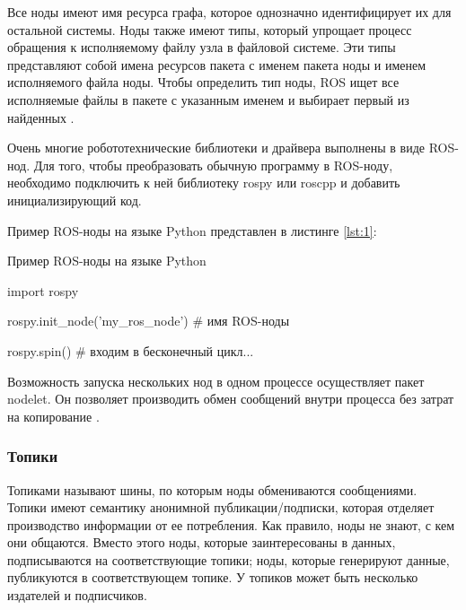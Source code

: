 Все ноды имеют имя ресурса графа, которое однозначно идентифицирует их для остальной системы. Ноды также имеют типы, который упрощает процесс обращения к исполняемому файлу узла в файловой системе. Эти типы представляют собой имена ресурсов пакета с именем пакета ноды и именем исполняемого файла ноды. Чтобы определить тип ноды, ROS ищет все исполняемые файлы в пакете с указанным именем и выбирает первый из найденных \cite{ros}. 


Очень многие робототехнические библиотеки и драйвера выполнены в виде ROS-нод.
Для того, чтобы преобразовать обычную программу в ROS-ноду, необходимо подключить к ней библиотеку rospy или roscpp и добавить инициализирующий код.

Пример ROS-ноды на языке Python представлен в листинге \ref{lst:1}:

\begin{Program}[H]
	\caption{Пример ROS-ноды на языке Python} \label{lst:1}
\begin{MyCode}
	import rospy
	
	rospy.init_node('my_ros_node')  # имя ROS-ноды
	
	rospy.spin()  # входим в бесконечный цикл...
\end{MyCode}
\end{Program}

Возможность запуска нескольких нод в одном процессе осуществляет пакет nodelet. Он позволяет производить обмен сообщений внутри процесса без затрат на копирование \cite{ros}.

\subsubsection{Топики}
Топиками называют шины, по которым ноды обмениваются сообщениями. Топики имеют семантику анонимной публикации/подписки, которая отделяет производство информации от ее потребления. Как правило, ноды не знают, с кем они общаются. Вместо этого ноды, которые заинтересованы в данных, подписываются на соответствующие топики; ноды, которые генерируют данные, публикуются в соответствующем топике. У топиков может быть несколько издателей и подписчиков.

